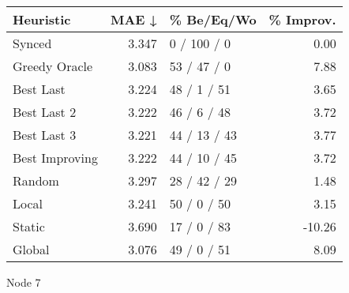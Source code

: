 \begin{tabular}{lrlr}
\toprule
\textbf{Heuristic} & \textbf{MAE ↓} & \textbf{\% Be/Eq/Wo} & \textbf{\% Improv.} \\
\midrule
            Synced &          3.347 &          0 / 100 / 0 &                0.00 \\
     Greedy Oracle &          3.083 &          53 / 47 / 0 &                7.88 \\
         Best Last &          3.224 &          48 / 1 / 51 &                3.65 \\
       Best Last 2 &          3.222 &          46 / 6 / 48 &                3.72 \\
       Best Last 3 &          3.221 &         44 / 13 / 43 &                3.77 \\
    Best Improving &          3.222 &         44 / 10 / 45 &                3.72 \\
            Random &          3.297 &         28 / 42 / 29 &                1.48 \\
             Local &          3.241 &          50 / 0 / 50 &                3.15 \\
            Static &          3.690 &          17 / 0 / 83 &              -10.26 \\
            Global &          3.076 &          49 / 0 / 51 &                8.09 \\
\bottomrule
\end{tabular}
\caption{Node 7}
\label{tab:ds_iid_lr05_le2_bs4_7}
